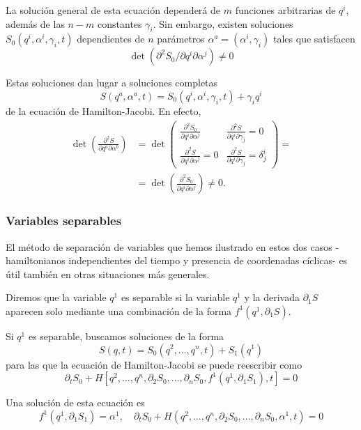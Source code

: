 La solución general de esta ecuación dependerá de $m$ funciones arbitrarias de $q^{i}$, además de las $n-m$ constantes $\gamma_{i}$. Sin embargo, existen soluciones $S_{0}\left(q^{i}, \alpha^{i}, \gamma_{i}, t\right)$ dependientes de $n$ parámetros $\alpha^{a}=\left(\alpha^{i}, \gamma_{i}\right)$ tales que satisfacen
$$
\operatorname{det}\left(\partial^{2} S_{0} / \partial q^{i} \partial \alpha^{j}\right) \neq 0
$$

Estas soluciones dan lugar a soluciones completas
$$
S\left(q^{a}, \alpha^{a}, t\right)=S_{0}\left(q^{i}, \alpha^{i}, \gamma_{i}, t\right)+\gamma_{i} q^{i}
$$
de la ecuación de Hamilton-Jacobi. En efecto,
$$
\begin{aligned}
\operatorname{det}\left(\frac{\partial^{2} S}{\partial q^{a} \partial \alpha^{b}}\right) & =\operatorname{det}\left(\begin{array}{l|l}
\frac{\partial^{2} S_{0}}{\partial q^{i} \partial \alpha^{j}} & \frac{\partial^{2} S}{\partial q^{i} \partial \gamma_{j}}=0 \\
\hline \frac{\partial^{2} S}{\partial q^{i} \partial \alpha^{j}}=0 & \frac{\partial^{2} S}{\partial q^{i} \partial \gamma_{j}}=\delta_{j}^{i}
\end{array}\right)= \\
& =\operatorname{det}\left(\frac{\partial^{2} S_{0}}{\partial q^{i} \partial \alpha^{j}}\right) \neq 0 .
\end{aligned}
$$
\subsubsection{Variables separables}
El método de separación de variables que hemos ilustrado en estos dos casos -hamiltonianos independientes del tiempo y presencia de coordenadas cíclicas- es útil también en otras situaciones más generales.

Diremos que la variable $q^{1}$ es separable si la variable $q^{1}$ y la derivada $\partial_{1} S$ aparecen solo mediante una combinación de la forma $f^{1}\left(q^{1}, \partial_{1} S\right)$.

Si $q^{1}$ es separable, buscamos soluciones de la forma
$$
S(q, t)=S_{0}\left(q^{2}, \ldots, q^{n}, t\right)+S_{1}\left(q^{1}\right)
$$
para las que la ecuación de Hamilton-Jacobi se puede reescribir como
$$
\partial_{t} S_{0}+H\left[q^{2}, \ldots, q^{n}, \partial_{2} S_{0}, \ldots, \partial_{n} S_{0}, f^{1}\left(q^{1}, \partial_{1} S_{1}\right), t\right]=0
$$

Una solución de esta ecuación es
$$
f^{1}\left(q^{1}, \partial_{1} S_{1}\right)=\alpha^{1}, \quad \partial_{t} S_{0}+H\left(q^{2}, \ldots, q^{n}, \partial_{2} S_{0}, \ldots, \partial_{n} S_{0}, \alpha^{1}, t\right)=0
$$


